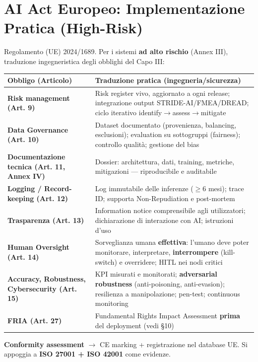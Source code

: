 \documentclass[11pt, a4paper]{article}
\begin{document}
\section{AI Act Europeo: Implementazione Pratica (High-Risk)}

Regolamento (UE) 2024/1689. Per i sistemi \textbf{ad alto rischio} (Annex III), traduzione ingegneristica degli obblighi del Capo III:

\noindent
\begin{tabularx}{\textwidth}{|>{\bfseries}l|X|}
\hline
Obbligo (Articolo) & \textbf{Traduzione pratica (ingegneria/sicurezza)} \\ \hline
Risk management (Art. 9) & Risk register vivo, aggiornato a ogni release; integrazione output STRIDE-AI/FMEA/DREAD; ciclo iterativo identify$\rightarrow$assess$\rightarrow$mitigate \\ \hline
Data Governance (Art. 10) & Dataset documentato (provenienza, balancing, esclusioni); evaluation su sottogruppi (fairness); controllo qualità; gestione del bias \\ \hline
Documentazione tecnica (Art. 11, Annex IV) & Dossier: architettura, dati, training, metriche, mitigazioni — riproducibile e auditabile \\ \hline
Logging / Record-keeping (Art. 12) & Log immutabile delle inferenze ($\ge 6$ mesi); trace ID; supporta Non-Repudiation e post-mortem \\ \hline
Trasparenza (Art. 13) & Information notice comprensibile agli utilizzatori; dichiarazione di interazione con AI; istruzioni d'uso \\ \hline
Human Oversight (Art. 14) & Sorveglianza umana \textbf{effettiva}: l'umano deve poter monitorare, interpretare, \textbf{interrompere} (kill-switch) e overridere; HITL nei nodi critici \\ \hline
Accuracy, Robustness, Cybersecurity (Art. 15) & KPI misurati e monitorati; \textbf{adversarial robustness} (anti-poisoning, anti-evasion); resilienza a manipolazione; pen-test; continuous monitoring \\ \hline
FRIA (Art. 27) & Fundamental Rights Impact Assessment \textbf{prima} del deployment (vedi §10) \\ \hline
\end{tabularx}

\vspace{0.3cm}
\textbf{Conformity assessment} $\rightarrow$ CE marking + registrazione nel database UE. Si appoggia a \textbf{ISO 27001 + ISO 42001} come evidenze.
\end{document}
